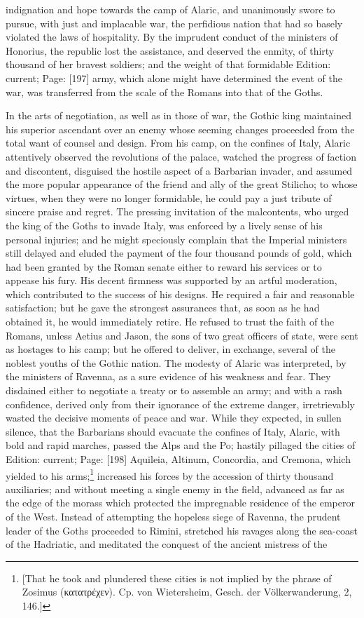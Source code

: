 indignation and hope towards the camp of Alaric, and unanimously swore to pursue, with just and implacable war, the perfidious nation that had so basely violated the laws of hospitality. By the imprudent conduct of the ministers of Honorius, the republic lost the assistance, and deserved the enmity, of thirty thousand of her bravest soldiers; and the weight of that formidable Edition: current; Page: [197] army, which alone might have determined the event of the war, was transferred from the scale of the Romans into that of the Goths.

In the arts of negotiation, as well as in those of war, the Gothic king maintained his superior ascendant over an enemy whose seeming changes proceeded from the total want of counsel and design. From his camp, on the confines of Italy, Alaric attentively observed the revolutions of the palace, watched the progress of faction and discontent, disguised the hostile aspect of a Barbarian invader, and assumed the more popular appearance of the friend and ally of the great Stilicho; to whose virtues, when they were no longer formidable, he could pay a just tribute of sincere praise and regret. The pressing invitation of the malcontents, who urged the king of the Goths to invade Italy, was enforced by a lively sense of his personal injuries; and he might speciously complain that the Imperial ministers still delayed and eluded the payment of the four thousand pounds of gold, which had been granted by the Roman senate either to reward his services or to appease his fury. His decent firmness was supported by an artful moderation, which contributed to the success of his designs. He required a fair and reasonable satisfaction; but he gave the strongest assurances that, as soon as he had obtained it, he would immediately retire. He refused to trust the faith of the Romans, unless Aetius and Jason, the sons of two great officers of state, were sent as hostages to his camp; but he offered to deliver, in exchange, several of the noblest youths of the Gothic nation. The modesty of Alaric was interpreted, by the ministers of Ravenna, as a sure evidence of his weakness and fear. They disdained either to negotiate a treaty or to assemble an army; and with a rash confidence, derived only from their ignorance of the extreme danger, irretrievably wasted the decisive moments of peace and war. While they expected, in sullen silence, that the Barbarians should evacuate the confines of Italy, Alaric, with bold and rapid marches, passed the Alps and the Po; hastily pillaged the cities of Edition: current; Page: [198] Aquileia, Altinum, Concordia, and Cremona, which yielded to his arms;\footnote{[That he took and plundered these cities is not implied by the phrase of Zosimus (\textgreek{κατατρέχεν}). Cp. von Wietersheim, Gesch. der Völkerwanderung, 2, 146.]} increased his forces by the accession of thirty thousand auxiliaries; and without meeting a single enemy in the field, advanced as far as the edge of the morass which protected the impregnable residence of the emperor of the West. Instead of attempting the hopeless siege of Ravenna, the prudent leader of the Goths proceeded to Rimini, stretched his ravages along the sea-coast of the Hadriatic, and meditated the conquest of the ancient mistress of the 